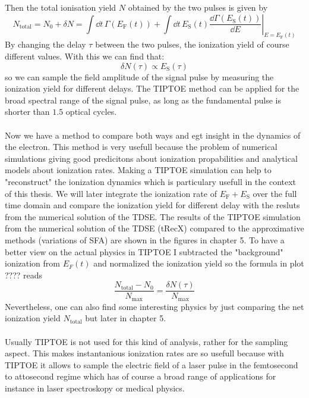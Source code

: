 Then the total ionisation yield $N$ obtained by the two pulses is given by
\begin{equation*}
    N_{\mathrm{total}}=N_0+\delta N = \int \dd t\,\Gamma(E_{\mathrm{F}}(t))+\int \dd t\,E_{\mathrm{S}}(t)\left.\frac{\dd \Gamma(E_{\mathrm{S}}(t))}{\dd E}\right|_{E=E_{\mathrm{F}}(t)}
\end{equation*}
By changing the delay $\tau$ between the two pulses, the ionization yield of course different values.
With this we can find that:
\begin{equation}
    \delta N(\tau)\propto E_{\mathrm{S}}(\tau)      \label{eq:tiptoeprop}
\end{equation}
so we can sample the field amplitude of the signal pulse by measuring the ionization yield for different delays.
The TIPTOE method can be applied for the broad spectral range of the signal pulse, as long as the fundamental pulse is shorter than $1.5$ optical cycles.\\\\
Now we have a method to compare both ways and egt insight in the dynamics of the electron. 
This method is very usefull because the problem of numerical simulations giving good predicitons about ionization propabilities and analytical models about ionization rates.
Making a TIPTOE simulation can help to "reconstruct" the ionization dynamics which is particulary usefull in the context of this thesis.
We will later integrate the ionization rate of $E_{\mathrm{F}}+E_{\mathrm{S}}$ over the full time domain and compare the ionization yield for different delay with the resluts from the numerical solution of the TDSE.
The results of the TIPTOE simulation from the numerical solution of the TDSE (tRecX) compared to the approximative methods (variations of SFA) are shown in the figures in chapter 5.
To have a better view on the actual physics in TIPTOE I subtracted the "background" ionization from $E_F(t)$ and normalized the ionization yield so the formula in plot ???? reads
\begin{equation*}
    \frac{N_{\mathrm{total}}-N_0}{N_{\mathrm{max}}}=\frac{\delta N(\tau)}{N_{\mathrm{max}}}
\end{equation*}
Nevertheless, one can also find some interesting physics by just comparing the net ionization yield $N_{\mathrm{total}}$ but later in chapter 5.\\\\
Usually TIPTOE is not used for this kind of analysis, rather for the sampling aspect.
This makes instantanious ionization rates are so usefull because with TIPTOE it allows to sample the electric field of a laser pulse in the femtosecond to attosecond regime which has of course a broad range of applications for instance in laser spectroskopy or medical physics.





